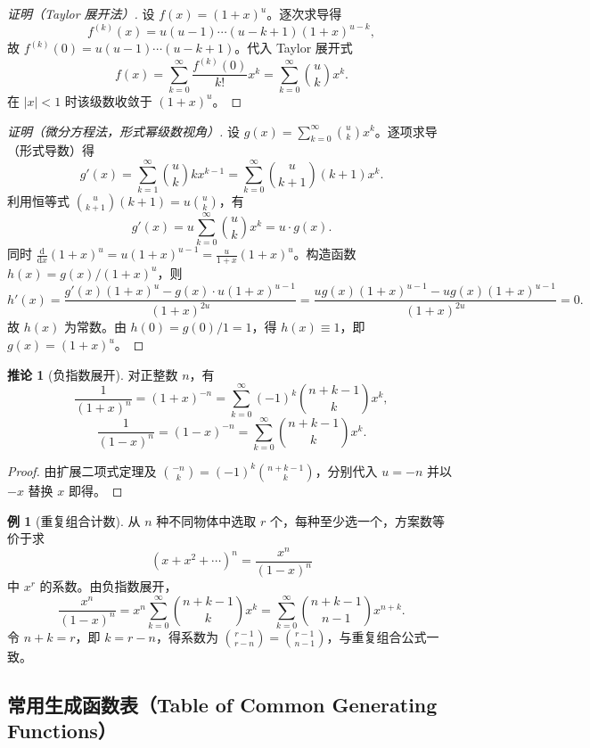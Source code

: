 \documentclass[UTF8,11pt,a4paper]{ctexbook}   %
\theoremstyle{definition}
\newtheorem{example}{例}[section]
\newtheorem{corollary}{推论}[section]
\begin{document}
\begin{proof}[证明（Taylor 展开法）]
设 $f(x)=(1+x)^u$。逐次求导得
\[
f^{(k)}(x)=u(u-1)\cdots(u-k+1)(1+x)^{u-k},
\]
故 $f^{(k)}(0)=u(u-1)\cdots(u-k+1)$。代入 Taylor 展开式
\[
f(x)=\sum_{k=0}^{\infty}\frac{f^{(k)}(0)}{k!}x^k
=\sum_{k=0}^{\infty}\binom{u}{k}x^k.
\]
在 $|x|<1$ 时该级数收敛于 $(1+x)^u$。
\end{proof}

\begin{proof}[证明（微分方程法，形式幂级数视角）]
设 $g(x)=\sum_{k=0}^{\infty}\binom{u}{k}x^k$。逐项求导（形式导数）得
\[
g'(x)=\sum_{k=1}^{\infty}\binom{u}{k}k x^{k-1}
=\sum_{k=0}^{\infty}\binom{u}{k+1}(k+1)x^k.
\]
利用恒等式 $\displaystyle\binom{u}{k+1}(k+1)=u\binom{u}{k}$，有
\[
g'(x)=u\sum_{k=0}^{\infty}\binom{u}{k}x^k=u\cdot g(x).
\]
同时 $\displaystyle\frac{\mathrm{d}}{\mathrm{d}x}(1+x)^u=u(1+x)^{u-1}=\frac{u}{1+x}(1+x)^u$。构造函数 $h(x)=g(x)/(1+x)^u$，则
\[
h'(x)=\frac{g'(x)(1+x)^u-g(x)\cdot u(1+x)^{u-1}}{(1+x)^{2u}}
=\frac{u g(x)(1+x)^{u-1}-u g(x)(1+x)^{u-1}}{(1+x)^{2u}}=0.
\]
故 $h(x)$ 为常数。由 $h(0)=g(0)/1=1$，得 $h(x)\equiv 1$，即 $g(x)=(1+x)^u$。
\end{proof}

\begin{corollary}[负指数展开]
对正整数 $n$，有
\[
\frac{1}{(1+x)^n}=(1+x)^{-n}=\sum_{k=0}^{\infty}(-1)^k\binom{n+k-1}{k}x^k,
\]
\[
\frac{1}{(1-x)^n}=(1-x)^{-n}=\sum_{k=0}^{\infty}\binom{n+k-1}{k}x^k.
\]
\end{corollary}

\begin{proof}
由扩展二项式定理及 $\binom{-n}{k}=(-1)^k\binom{n+k-1}{k}$，分别代入 $u=-n$ 并以 $-x$ 替换 $x$ 即得。
\end{proof}

\begin{example}[重复组合计数]
从 $n$ 种不同物体中选取 $r$ 个，每种至少选一个，方案数等价于求
\[
(x+x^2+\cdots)^n=\frac{x^n}{(1-x)^n}
\]
中 $x^r$ 的系数。由负指数展开，
\[
\frac{x^n}{(1-x)^n}=x^n\sum_{k=0}^{\infty}\binom{n+k-1}{k}x^k
=\sum_{k=0}^{\infty}\binom{n+k-1}{n-1}x^{n+k}.
\]
令 $n+k=r$，即 $k=r-n$，得系数为 $\displaystyle\binom{r-1}{r-n}=\binom{r-1}{n-1}$，与重复组合公式一致。
\end{example}

\subsection{常用生成函数表（Table of Common Generating Functions）}
\end{document}
